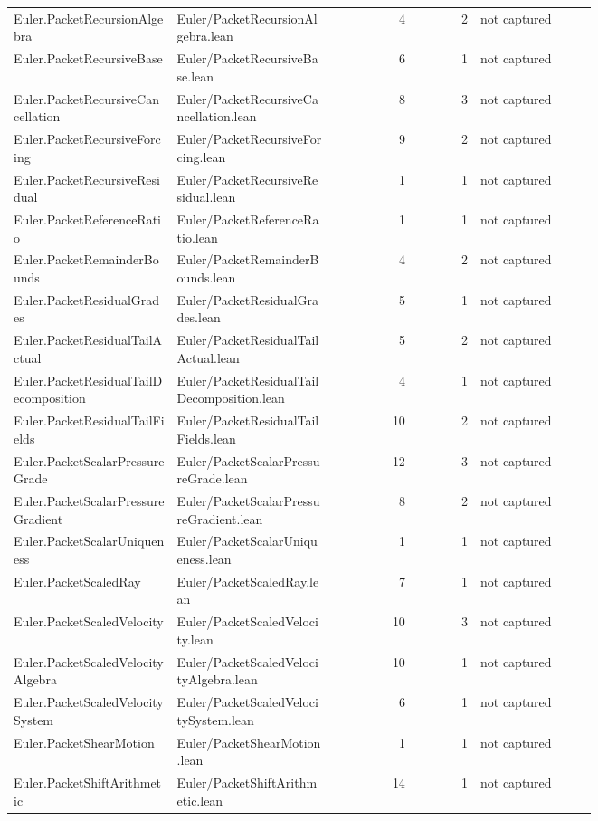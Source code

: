 \documentclass[10pt]{article}
\begin{document}
\begin{longtable}{p{0.28\linewidth}p{0.27\linewidth}r r p{0.20\linewidth}}
Euler.PacketRecursionAlgebra & Euler/PacketRecursionAlgebra.lean & 4 & 2 & not captured\\
Euler.PacketRecursiveBase & Euler/PacketRecursiveBase.lean & 6 & 1 & not captured\\
Euler.PacketRecursiveCancellation & Euler/PacketRecursiveCancellation.lean & 8 & 3 & not captured\\
Euler.PacketRecursiveForcing & Euler/PacketRecursiveForcing.lean & 9 & 2 & not captured\\
Euler.PacketRecursiveResidual & Euler/PacketRecursiveResidual.lean & 1 & 1 & not captured\\
Euler.PacketReferenceRatio & Euler/PacketReferenceRatio.lean & 1 & 1 & not captured\\
Euler.PacketRemainderBounds & Euler/PacketRemainderBounds.lean & 4 & 2 & not captured\\
Euler.PacketResidualGrades & Euler/PacketResidualGrades.lean & 5 & 1 & not captured\\
Euler.PacketResidualTailActual & Euler/PacketResidualTailActual.lean & 5 & 2 & not captured\\
Euler.PacketResidualTailDecomposition & Euler/PacketResidualTailDecomposition.lean & 4 & 1 & not captured\\
Euler.PacketResidualTailFields & Euler/PacketResidualTailFields.lean & 10 & 2 & not captured\\
Euler.PacketScalarPressureGrade & Euler/PacketScalarPressureGrade.lean & 12 & 3 & not captured\\
Euler.PacketScalarPressureGradient & Euler/PacketScalarPressureGradient.lean & 8 & 2 & not captured\\
Euler.PacketScalarUniqueness & Euler/PacketScalarUniqueness.lean & 1 & 1 & not captured\\
Euler.PacketScaledRay & Euler/PacketScaledRay.lean & 7 & 1 & not captured\\
Euler.PacketScaledVelocity & Euler/PacketScaledVelocity.lean & 10 & 3 & not captured\\
Euler.PacketScaledVelocityAlgebra & Euler/PacketScaledVelocityAlgebra.lean & 10 & 1 & not captured\\
Euler.PacketScaledVelocitySystem & Euler/PacketScaledVelocitySystem.lean & 6 & 1 & not captured\\
Euler.PacketShearMotion & Euler/PacketShearMotion.lean & 1 & 1 & not captured\\
Euler.PacketShiftArithmetic & Euler/PacketShiftArithmetic.lean & 14 & 1 & not captured\\

\end{longtable}
\end{document}
